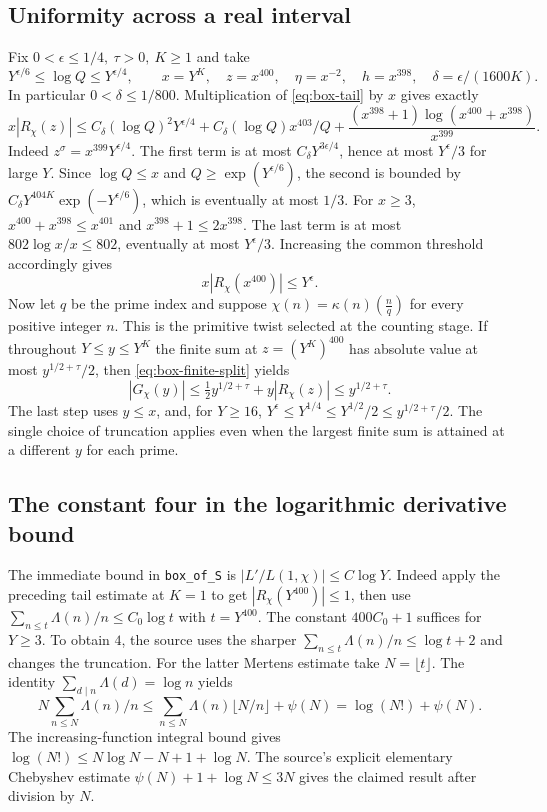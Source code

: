 \subsection{Uniformity across a real interval}

Fix \(0<\epsilon\le1/4,\ \tau>0,\ K\ge1\) and take
\[
    Y^{\epsilon/6}\le \log Q\le Y^{\epsilon/4},\qquad
    x=Y^K,\quad z=x^{400},\quad \eta=x^{-2},\quad
    h=x^{398},\quad \delta=\epsilon/(1600K).
\]
In particular \(0<\delta\le1/800\).
Multiplication of \eqref{eq:box-tail} by \(x\) gives exactly
\[
 x|R_\chi(z)|\le C_\delta(\log Q)^2Y^{\epsilon/4}
   +C_\delta(\log Q)x^{403}/Q
   +\frac{(x^{398}+1)\log(x^{400}+x^{398})}{x^{399}} .
\]
Indeed \(z^\sigma=x^{399}Y^{\epsilon/4}\).
The first term is at most \(C_\delta Y^{3\epsilon/4}\), hence at
most \(Y^\epsilon/3\) for large \(Y\). Since \(\log Q\le x\)
and \(Q\ge\exp(Y^{\epsilon/6})\), the second is bounded by
\(C_\delta Y^{404K}\exp(-Y^{\epsilon/6})\), which is eventually
at most \(1/3\). For \(x\ge3\), \(x^{400}+x^{398}\le x^{401}\)
and \(x^{398}+1\le2x^{398}\). The last term is at most
\(802\log x/x\le802\), eventually at most \(Y^\epsilon/3\).
Increasing the common threshold accordingly gives
\[
                      x|R_\chi(x^{400})|\le Y^\epsilon .
\]
Now let \(q\) be the prime index and suppose
\(\chi(n)=\kappa(n)(\frac{n}{q})\) for every positive integer
\(n\). This is the primitive twist selected at the counting stage.
If throughout \(Y\le y\le Y^K\) the finite sum at
\(z=(Y^K)^{400}\) has absolute value at most
\(y^{1/2+\tau}/2\), then \eqref{eq:box-finite-split} yields
\[
 |G_\chi(y)|\le \tfrac12y^{1/2+\tau}+y|R_\chi(z)|
                    \le y^{1/2+\tau}.
\]
The last step uses \(y\le x\), and, for \(Y\ge16\),
\(Y^\epsilon\le Y^{1/4}\le Y^{1/2}/2\le y^{1/2+\tau}/2\).
The single choice of truncation applies even when the largest
finite sum is attained at a different \(y\) for each prime.

\subsection{The constant four in the logarithmic derivative bound}

The immediate bound in \texttt{box\_of\_S} is
\(|L'/L(1,\chi)|\le C\log Y\). Indeed apply the preceding tail
estimate at \(K=1\) to get \(|R_\chi(Y^{400})|\le1\), then use
\(\sum_{n\le t}\Lambda(n)/n\le C_0\log t\) with \(t=Y^{400}\). The constant
\(400C_0+1\) suffices for \(Y\ge3\).
To obtain \(4\), the source uses the sharper
\(\sum_{n\le t}\Lambda(n)/n\le\log t+2\) and changes the
truncation. For the latter Mertens estimate take \(N=\lfloor t\rfloor\).
The identity \(\sum_{d\mid n}\Lambda(d)=\log n\) yields
\[
 N\sum_{n\le N}\Lambda(n)/n
 \le\sum_{n\le N}\Lambda(n)\lfloor N/n\rfloor+\psi(N)
 =\log(N!)+\psi(N).
\]
The increasing-function integral bound gives
\(\log(N!)\le N\log N-N+1+\log N\).
The source's explicit elementary Chebyshev estimate
\(\psi(N)+1+\log N\le3N\) gives the claimed result after
division by \(N\).

